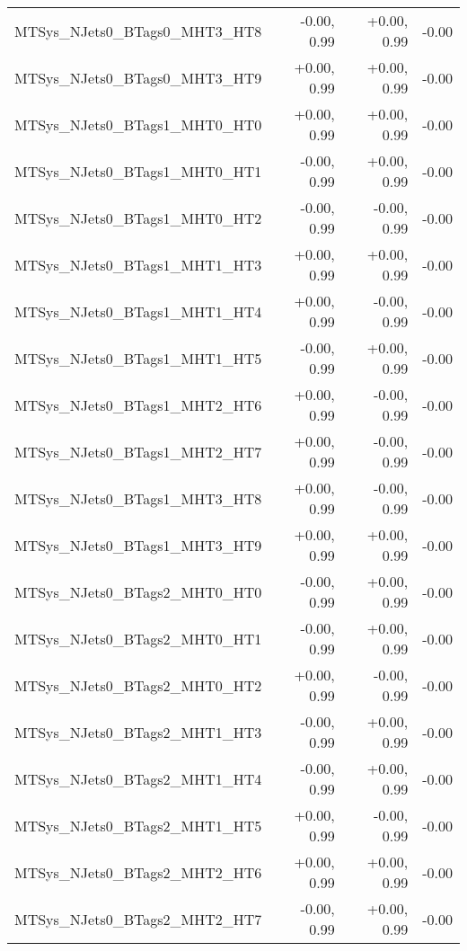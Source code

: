 \begin{tabular}{|l|r|r|r|}
MTSys\_NJets0\_BTags0\_MHT3\_HT8         &      -0.00, 0.99 &     +0.00, 0.99 &  -0.00 \\
MTSys\_NJets0\_BTags0\_MHT3\_HT9         &      +0.00, 0.99 &     +0.00, 0.99 &  -0.00 \\
MTSys\_NJets0\_BTags1\_MHT0\_HT0         &      +0.00, 0.99 &     +0.00, 0.99 &  -0.00 \\
MTSys\_NJets0\_BTags1\_MHT0\_HT1         &      -0.00, 0.99 &     +0.00, 0.99 &  -0.00 \\
MTSys\_NJets0\_BTags1\_MHT0\_HT2         &      -0.00, 0.99 &     -0.00, 0.99 &  -0.00 \\
MTSys\_NJets0\_BTags1\_MHT1\_HT3         &      +0.00, 0.99 &     +0.00, 0.99 &  -0.00 \\
MTSys\_NJets0\_BTags1\_MHT1\_HT4         &      +0.00, 0.99 &     -0.00, 0.99 &  -0.00 \\
MTSys\_NJets0\_BTags1\_MHT1\_HT5         &      -0.00, 0.99 &     +0.00, 0.99 &  -0.00 \\
MTSys\_NJets0\_BTags1\_MHT2\_HT6         &      +0.00, 0.99 &     -0.00, 0.99 &  -0.00 \\
MTSys\_NJets0\_BTags1\_MHT2\_HT7         &      +0.00, 0.99 &     -0.00, 0.99 &  -0.00 \\
MTSys\_NJets0\_BTags1\_MHT3\_HT8         &      +0.00, 0.99 &     -0.00, 0.99 &  -0.00 \\
MTSys\_NJets0\_BTags1\_MHT3\_HT9         &      +0.00, 0.99 &     +0.00, 0.99 &  -0.00 \\
MTSys\_NJets0\_BTags2\_MHT0\_HT0         &      -0.00, 0.99 &     +0.00, 0.99 &  -0.00 \\
MTSys\_NJets0\_BTags2\_MHT0\_HT1         &      -0.00, 0.99 &     +0.00, 0.99 &  -0.00 \\
MTSys\_NJets0\_BTags2\_MHT0\_HT2         &      +0.00, 0.99 &     -0.00, 0.99 &  -0.00 \\
MTSys\_NJets0\_BTags2\_MHT1\_HT3         &      -0.00, 0.99 &     +0.00, 0.99 &  -0.00 \\
MTSys\_NJets0\_BTags2\_MHT1\_HT4         &      -0.00, 0.99 &     +0.00, 0.99 &  -0.00 \\
MTSys\_NJets0\_BTags2\_MHT1\_HT5         &      +0.00, 0.99 &     -0.00, 0.99 &  -0.00 \\
MTSys\_NJets0\_BTags2\_MHT2\_HT6         &      +0.00, 0.99 &     +0.00, 0.99 &  -0.00 \\
MTSys\_NJets0\_BTags2\_MHT2\_HT7         &      -0.00, 0.99 &     +0.00, 0.99 &  -0.00 \\

\end{tabular}
